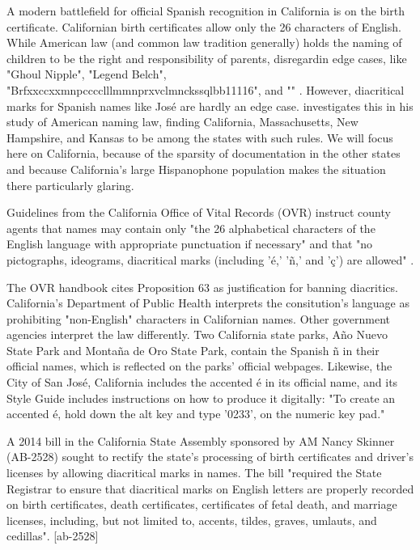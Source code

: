 A modern battlefield for official Spanish recognition in California is on the
birth certificate. Californian birth certificates allow only the 26 characters
of English. While American law (and common law tradition generally) holds the
naming of children to be the right and responsibility of parents, disregardin
edge cases, like "Ghoul Nipple", "Legend Belch",
"Brfxxccxxmnpcccclllmmnprxvclmnckssqlbb11116", and "" \parencite{larson11}.
However, diacritical marks for Spanish names like José are hardly an edge case.
\textcite[5]{larson11} investigates this in his study of American naming law,
finding California, Massachusetts, New Hampshire, and Kansas to be among the
states with such rules. We will focus here on California, because of the
sparsity of documentation in the other states and because California's large
Hispanophone population makes the situation there particularly glaring.

Guidelines from the California Office of Vital Records (OVR) instruct county
agents that names may contain only "the 26 alphabetical characters of the
English language with appropriate punctuation if necessary" and that "no
pictographs, ideograms, diacritical marks (including 'é,' 'ñ,' and 'ç') are
allowed" \parencite{larson11}.

The OVR handbook cites Proposition 63 as justification for banning diacritics.
California's Department of Public Health interprets the consitution's language
as prohibiting "non-English" characters in Californian names. Other government
agencies interpret the law differently. Two California state parks, Año Nuevo
State Park and Montaña de Oro State Park, contain the Spanish ñ in their
official names, which is reflected on the parks' official webpages.
\parencite{año-nuevo} \parencite{montaña-de-oro} Likewise, the City of San José,
California includes the accented é in its official name, and its Style Guide
includes instructions on how to produce it digitally: "To create an accented é,
hold down the alt key and type '0233'‚ on the numeric key pad."
\textcite{san-josé}

A 2014 bill in the California State Assembly sponsored by AM Nancy Skinner
(AB-2528) sought to rectify the state's processing of birth certificates and
driver's licenses by allowing diacritical marks in names. The bill "required the
State Registrar to ensure that diacritical marks on English letters are properly
recorded on birth certificates, death certificates, certificates of fetal death,
and marriage licenses, including, but not limited to, accents, tildes, graves,
umlauts, and cedillas". [ab-2528]

